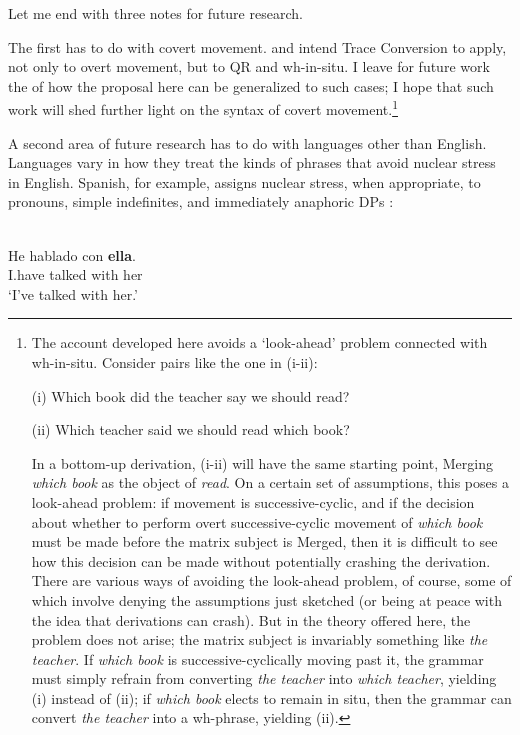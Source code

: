 \documentclass[output=paper]{LSP/langsci}
\begin{document}
  Let me end with three notes for future research.

  The first has to do with covert movement.  \citet{Fox1999,Fox2003} and \citet{Sauerland1998,Sauerland2004} intend Trace Conversion to apply, not only to overt movement, but to QR and wh-in-situ.  I leave for future work the  of how the proposal here can be generalized to such cases; I hope that such work will shed further light on the syntax of covert movement.\footnote{The account developed here avoids a `look-ahead' problem connected with wh-in-situ.  Consider pairs like the one in (i-ii):
  
(i)  Which book did the teacher say we should read?

(ii) Which teacher said we should read which book?

\noindent In a bottom-up derivation, (i-ii) will have the same starting point, Merging \textit{which book} as the object of \textit{read}.  On a certain set of assumptions, this poses a look-ahead problem: if movement is successive-cyclic, and if the decision about whether to perform overt successive-cyclic movement of \textit{which book} must be made before the matrix subject is Merged, then it is difficult to see how this decision can be made without potentially crashing the derivation.  There are various ways of avoiding the look-ahead problem, of course, some of which involve denying the assumptions just sketched (or being at peace with the idea that derivations can crash).  But in the theory offered here, the problem does not arise; the matrix subject is invariably something like \textit{the teacher}.  If \textit{which book} is successive-cyclically moving past it, the grammar must simply refrain from converting \textit{the teacher} into \textit{which teacher}, yielding (i) instead of (ii); if \textit{which book} elects to remain in situ, then the grammar can convert \textit{the teacher} into a wh-phrase, yielding (ii).}

  A second area of future research has to do with languages other than English.  Languages vary in how they treat the kinds of phrases that avoid nuclear stress in English.  Spanish, for example, assigns nuclear stress, when appropriate, to pronouns, simple indefinites, and immediately anaphoric DPs \citep{Zubizarreta1998,Hualde2007,NavaZubizarreta2009,NavaZubizarreta2011}:


\ea%
    \label{ex:richards:65}

\\
\ea 
\gll  He  hablado  con  \textbf{ella}.\\
  I.have  talked  with  her\\
\glt  \textup{‘I’ve} talked \textup{with her}.’
\end{document}
